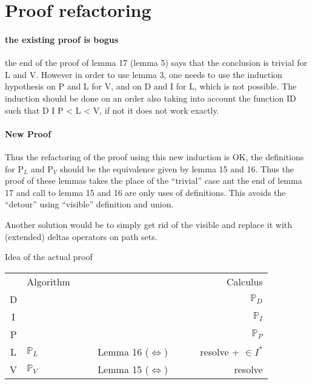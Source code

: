 \section{Proof refactoring}

\paragraph{the existing proof is bogus} the end of the proof of lemma 17 (lemma 5) says that the conclusion is trivial for L and V. However in order to use lemma 3, one needs to use the induction hypothesis on P and L for V, and on D and I for L, which is not possible. The induction should be done on an order also taking into account the function ID such that {D I P} < L < V, if not it does not work exactly.

\paragraph{New Proof} Thus the refactoring of the proof using this new induction is OK, the definitions for P$_L$ and P$_V$ should be the equivalence given by lemma 15 and 16. Thus the proof of these lemmas takes the place of the ``trivial'' case ant the end of lemma 17 and call to lemma 15 and 16 are only uses of definitions. This avoids the ``detour'' using ``visible'' definition and union.

Another solution would be to simply get rid of the visible and replace it with (extended) deltas operators on  path sets.

Idea of the actual proof 

\begin{tabular}{c|llr}
  & Algorithm & & Calculus\\
  D & & & $\mathbb{P}_D$\\
  I & & & $\mathbb{P}_I$ \\
  P & & & $\mathbb{P}_P$ \\
  L & $\mathbb{P}_L$ & ~~~ Lemma 16 ($\Leftrightarrow$) ~~~~ & resolve + $\in I^*$ \\ 
  V & $\mathbb{P}_V$ & ~~~ Lemma 15 ($\Leftrightarrow$) & resolve\\
\end{tabular}